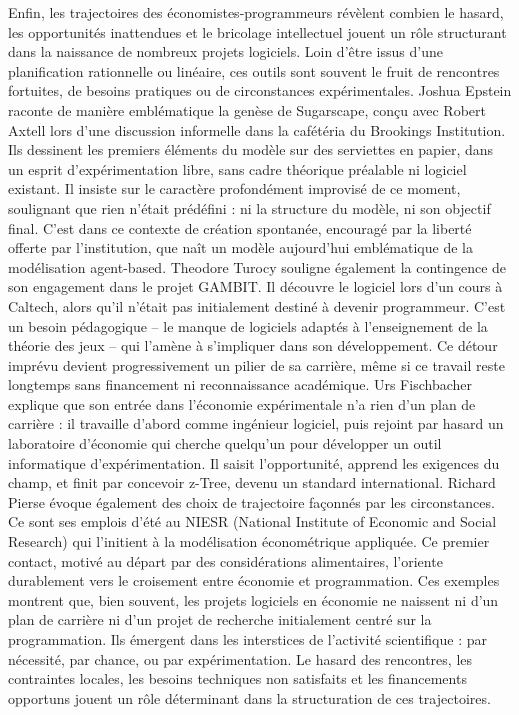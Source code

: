 Enfin, les trajectoires des économistes-programmeurs révèlent combien le hasard, les opportunités inattendues et le bricolage intellectuel jouent un rôle structurant dans la naissance de nombreux projets logiciels. Loin d’être issus d’une planification rationnelle ou linéaire, ces outils sont souvent le fruit de rencontres fortuites, de besoins pratiques ou de circonstances expérimentales. Joshua Epstein raconte de manière emblématique la genèse de Sugarscape, conçu avec Robert Axtell lors d’une discussion informelle dans la cafétéria du Brookings Institution. Ils dessinent les premiers éléments du modèle sur des serviettes en papier, dans un esprit d’expérimentation libre, sans cadre théorique préalable ni logiciel existant. Il insiste sur le caractère profondément improvisé de ce moment, soulignant que rien n’était prédéfini : ni la structure du modèle, ni son objectif final. C’est dans ce contexte de création spontanée, encouragé par la liberté offerte par l’institution, que naît un modèle aujourd’hui emblématique de la modélisation agent-based. Theodore Turocy souligne également la contingence de son engagement dans le projet GAMBIT. Il découvre le logiciel lors d’un cours à Caltech, alors qu’il n’était pas initialement destiné à devenir programmeur. C’est un besoin pédagogique – le manque de logiciels adaptés à l’enseignement de la théorie des jeux – qui l’amène à s’impliquer dans son développement. Ce détour imprévu devient progressivement un pilier de sa carrière, même si ce travail reste longtemps sans financement ni reconnaissance académique. Urs Fischbacher explique que son entrée dans l’économie expérimentale n’a rien d’un plan de carrière : il travaille d’abord comme ingénieur logiciel, puis rejoint par hasard un laboratoire d’économie qui cherche quelqu’un pour développer un outil informatique d’expérimentation. Il saisit l’opportunité, apprend les exigences du champ, et finit par concevoir z-Tree, devenu un standard international. Richard Pierse évoque également des choix de trajectoire façonnés par les circonstances. Ce sont ses emplois d’été au NIESR (National Institute of Economic and Social Research) qui l’initient à la modélisation économétrique appliquée. Ce premier contact, motivé au départ par des considérations alimentaires, l’oriente durablement vers le croisement entre économie et programmation. Ces exemples montrent que, bien souvent, les projets logiciels en économie ne naissent ni d’un plan de carrière ni d’un projet de recherche initialement centré sur la programmation. Ils émergent dans les interstices de l’activité scientifique : par nécessité, par chance, ou par expérimentation. Le hasard des rencontres, les contraintes locales, les besoins techniques non satisfaits et les financements opportuns jouent un rôle déterminant dans la structuration de ces trajectoires.


